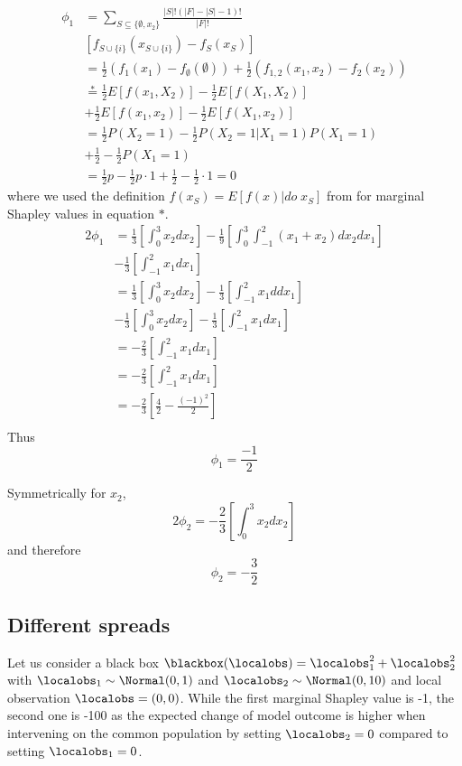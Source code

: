 \begin{align*}
    \phi_{1} &= \sum_{S\subseteq \{\emptyset, x_{2}\}} \frac{|S| !(|F|-|S|-1) !}{|F| !} \\
    &\left[f_{S \cup\{i\}}\left(x_{S \cup\{i\}}\right)-f_{S}\left(x_{S}\right)\right]\\
    & = \frac{1}{2} (f_{1}(x_{1})-f_{\emptyset}(\emptyset)) + \frac{1}{2} (f_{1, 2}(x_{1}, x_{2}) - f_{2}(x_{2}))\\
    & \overset{*}{=} \frac{1}{2}E[f(x_{1}, X_{2})] - \frac{1}{2}E[f(X_{1}, X_{2})] \\ &+ \frac{1}{2} E[f(x_{1}, x_{2})] - \frac{1}{2} E[f(X_{1}, x_{2})]\\
    & = \frac{1}{2}P(X_{2}=1) - \frac{1}{2}P(X_{2}=1|X_{1}=1)P(X_{1}=1) \\ &+ \frac{1}{2} - \frac{1}{2} P(X_{1}=1)\\
    & = \frac{1}{2}p - \frac{1}{2}p\cdot 1 + \frac{1}{2} - \frac{1}{2}\cdot 1 = 0
\end{align*}
where we used the definition $f(x_S)=E[f(x)|do\;x_S]$ from \cite{janzing2020feature} for marginal Shapley values in equation $*$.
\begin{align*}
    2\phi_1 & = \frac{1}{3}[\int_{0}^{3} x_2 d x_2 ] - \frac{1}{9} [\int_{0}^{3} \int_{-1}^{2} (x_1+x_2) d x_2 d x_1 ] \\& - \frac{1}{3}[\int_{-1}^{2} x_1 d x_1 ]\\
    & = \frac{1}{3}[\int_{0}^{3} x_2 d x_2 ] - \frac{1}{3} [\int_{-1}^{2} x_1 d d x_1 ] \\& -\frac{1}{3} [\int_{0}^{3} x_2 d x_2 ] - \frac{1}{3}[\int_{-1}^{2} x_1 d x_1 ]\\
    & = - \frac{2}{3} [\int_{-1}^{2} x_1 d x_1 ] \\
    & = - \frac{2}{3} [\int_{-1}^{2} x_1 d x_1 ] \\
    & = - \frac{2}{3} [\frac{4}{2} - \frac{(-1)^2}{2}] \\
\end{align*}
Thus
$$\phi_1 = \frac{-1}{2} $$

Symmetrically for $x_2$,
$$2\phi_2 = - \frac{2}{3} [\int_{0}^{3} x_2 d x_2 ]$$
and therefore
$$\phi_2 = - \frac{3}{2}$$

\subsection{Different spreads}
\label{sec:suppl_marg_spread}

Let us consider a black box $\blackbox(\localobs)=\localobs_1^2+\localobs_2^2$ with $\localobs_1\sim\Normal(0, 1)$ and $\localobs_2\sim\Normal(0, 10)$ and local observation $\localobs=(0, 0)$. While the first marginal Shapley value is -1, the second one is -100 as the expected change of model outcome is higher when intervening on the common population by setting $\localobs_2=0$ compared to setting $\localobs_1=0$. 

